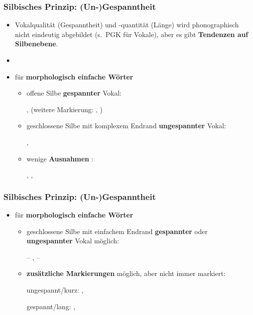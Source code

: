 \begin{frame}
\frametitle{Silbisches Prinzip: (Un-)Gespanntheit}

\begin{itemize}
	\item Vokalqualität (\dash Gespanntheit) und -quantität (\dash Länge) wird phonographisch nicht eindeutig abgebildet (s.\ PGK für Vokale), aber es gibt \textbf{Tendenzen auf Silbenebene}.
	\item[]
	\item für \textbf{morphologisch einfache Wörter} 
	
	\begin{itemize}
		\item offene Silbe \ras \textbf{gespannter} Vokal: 
		
		\ea {},  (weitere Markierung: , )
		\z
		
		\item geschlossene Silbe mit komplexem Endrand \ras \textbf{ungespannter} Vokal: 
		
		\ea
		, 
		\z
		
		\item wenige \textbf{Ausnahmen} \citep[vgl.][15]{Fuhrhop09a}: 
		
		\ea
		, , 
		\z
		
	\end{itemize}
\end{itemize}
\end{frame}


\begin{frame}
\frametitle{Silbisches Prinzip: (Un-)Gespanntheit}

\begin{itemize}
	\item für \textbf{morphologisch einfache Wörter}
	
	\begin{itemize}
		\item geschlossene Silbe mit einfachem Endrand \ras \textbf{gespannter} oder \textbf{ungespannter} Vokal möglich:
		
		\ea {} -- ,  -- 
		\z

\pause 
		
		\item \textbf{zusätzliche Markierungen} möglich, aber nicht immer markiert: 
		
		\ea 
			\ea ungespannt/kurz: , 
		
			\ex gespannt/lang: , 
			\z
		\z 
	\end{itemize}
\end{itemize}

\end{frame}


